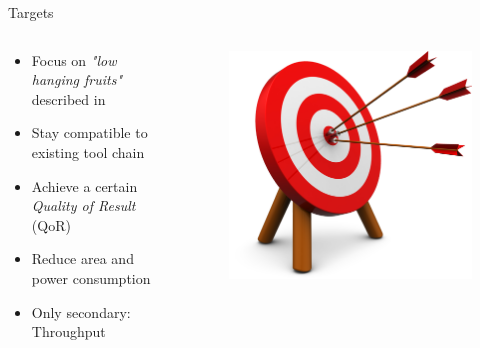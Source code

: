 \documentclass{beamer}
\begin{document}
\begin{frame}{Targets}
\begin {columns}
 \begin{column}{0.7\textwidth}
 
    \begin{itemize}
        \item<1->Focus on \textit{"low hanging fruits"} described in \cite{Mittal:2016:STA:2891449.2893356}
        \item<2->Stay compatible to existing tool chain
        \item<3->Achieve a certain \textit{Quality of Result} (QoR)
        \item<4->Reduce area and power consumption
        \item<5->Only secondary: Throughput
    \end{itemize}
    
 \end{column}
  \begin{column}{0.3\textwidth}
    \begin{figure}
     \includegraphics[width=\textwidth]{img/target.png}
    \end{figure}
  \end{column}
\end {columns}
\end{frame}
\end{document}
